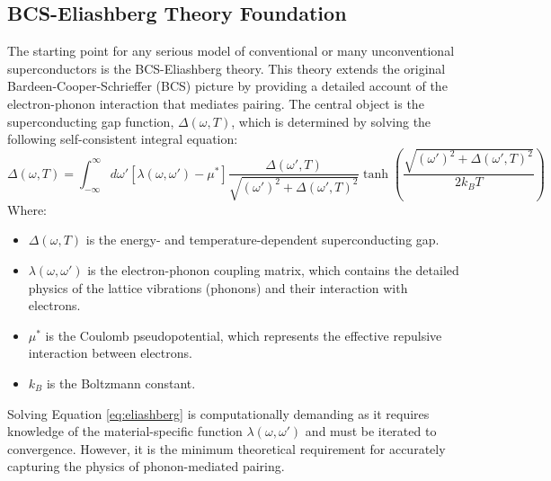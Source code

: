 \subsection{BCS-Eliashberg Theory Foundation}
The starting point for any serious model of conventional or many unconventional superconductors is the BCS-Eliashberg theory. This theory extends the original Bardeen-Cooper-Schrieffer (BCS) picture by providing a detailed account of the electron-phonon interaction that mediates pairing. The central object is the superconducting gap function, $\Delta(\omega, T)$, which is determined by solving the following self-consistent integral equation:
\begin{equation}
\Delta(\omega,T) = \int_{-\infty}^{\infty} d\omega' \left[ \lambda(\omega,\omega') - \mu^* \right] \frac{\Delta(\omega',T)}{\sqrt{(\omega')^2 + \Delta(\omega',T)^2}} \tanh\left(\frac{\sqrt{(\omega')^2 + \Delta(\omega',T)^2}}{2k_B T}\right)
\label{eq:eliashberg}
\end{equation}
Where:
\begin{itemize}
    \item $\Delta(\omega,T)$ is the energy- and temperature-dependent superconducting gap.
    \item $\lambda(\omega,\omega')$ is the electron-phonon coupling matrix, which contains the detailed physics of the lattice vibrations (phonons) and their interaction with electrons.
    \item $\mu^*$ is the Coulomb pseudopotential, which represents the effective repulsive interaction between electrons.
    \item $k_B$ is the Boltzmann constant.
\end{itemize}
Solving Equation \ref{eq:eliashberg} is computationally demanding as it requires knowledge of the material-specific function $\lambda(\omega,\omega')$ and must be iterated to convergence. However, it is the minimum theoretical requirement for accurately capturing the physics of phonon-mediated pairing.
